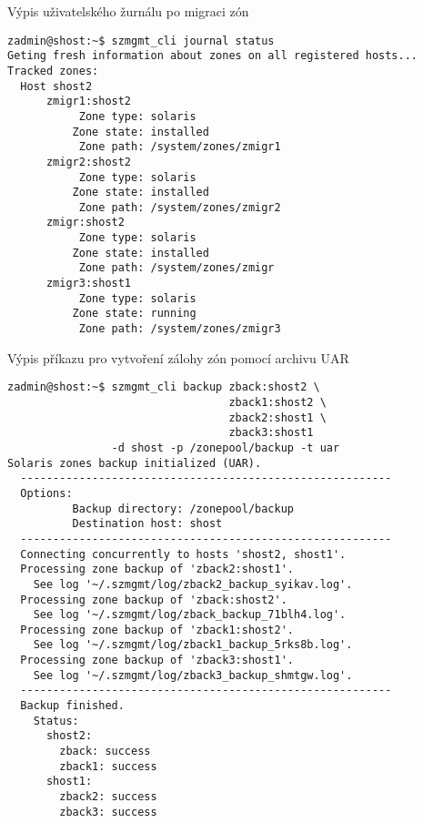 \begin{listing}[ht]
  \caption{Výpis uživatelského žurnálu po migraci zón}
  \label{code:test:migration:after}
  \begin{verbatim}
zadmin@shost:~$ szmgmt_cli journal status
Geting fresh information about zones on all registered hosts...
Tracked zones:  
  Host shost2
      zmigr1:shost2
           Zone type: solaris
          Zone state: installed
           Zone path: /system/zones/zmigr1
      zmigr2:shost2
           Zone type: solaris
          Zone state: installed
           Zone path: /system/zones/zmigr2
      zmigr:shost2
           Zone type: solaris
          Zone state: installed
           Zone path: /system/zones/zmigr  
      zmigr3:shost1
           Zone type: solaris
          Zone state: running
           Zone path: /system/zones/zmigr3
  \end{verbatim}
\end{listing}


\begin{listing}[ht]
  \caption{Výpis příkazu pro vytvoření zálohy zón pomocí archivu UAR}
  \label{code:test:backup}
  \begin{verbatim}
zadmin@shost:~$ szmgmt_cli backup zback:shost2 \
                                  zback1:shost2 \
                                  zback2:shost1 \
                                  zback3:shost1
                -d shost -p /zonepool/backup -t uar
Solaris zones backup initialized (UAR).
  ---------------------------------------------------------
  Options:
          Backup directory: /zonepool/backup
          Destination host: shost
  ---------------------------------------------------------
  Connecting concurrently to hosts 'shost2, shost1'.
  Processing zone backup of 'zback2:shost1'. 
    See log '~/.szmgmt/log/zback2_backup_syikav.log'.
  Processing zone backup of 'zback:shost2'. 
    See log '~/.szmgmt/log/zback_backup_71blh4.log'.
  Processing zone backup of 'zback1:shost2'. 
    See log '~/.szmgmt/log/zback1_backup_5rks8b.log'.
  Processing zone backup of 'zback3:shost1'. 
    See log '~/.szmgmt/log/zback3_backup_shmtgw.log'.
  ---------------------------------------------------------
  Backup finished.
    Status:
      shost2:
        zback: success
        zback1: success
      shost1:
        zback2: success
        zback3: success
  \end{verbatim}
\end{listing}


